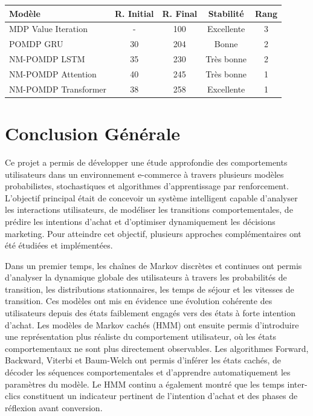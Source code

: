 \documentclass[11pt,a4paper]{article}
\begin{document}
\begin{center}
\begin{tabularx}{0.95\linewidth}{|l|c|c|c|c|}
\hline
\textbf{Modèle} & \textbf{R. Initial} & \textbf{R. Final} & \textbf{Stabilité} & \textbf{Rang} \\
\hline
MDP Value Iteration & - & 100 & Excellente & 3 \\
POMDP GRU & 30 & 204 & Bonne & 2 \\
NM-POMDP LSTM & 35 & 230 & Très bonne & 2 \\
NM-POMDP Attention & 40 & 245 & Très bonne & 1 \\
NM-POMDP Transformer & 38 & 258 & Excellente & 1 \\
\hline
\end{tabularx}
\end{center}
\newpage
\section{Conclusion Générale}




Ce projet a permis de développer une étude approfondie des comportements utilisateurs dans un environnement e-commerce à travers plusieurs modèles probabilistes, stochastiques et algorithmes d’apprentissage par renforcement. L’objectif principal était de concevoir un système intelligent capable d’analyser les interactions utilisateurs, de modéliser les transitions comportementales, de prédire les intentions d’achat et d’optimiser dynamiquement les décisions marketing. Pour atteindre cet objectif, plusieurs approches complémentaires ont été étudiées et implémentées.

Dans un premier temps, les chaînes de Markov discrètes et continues ont permis d’analyser la dynamique globale des utilisateurs à travers les probabilités de transition, les distributions stationnaires, les temps de séjour et les vitesses de transition. Ces modèles ont mis en évidence une évolution cohérente des utilisateurs depuis des états faiblement engagés vers des états à forte intention d’achat. Les modèles de Markov cachés (HMM) ont ensuite permis d’introduire une représentation plus réaliste du comportement utilisateur, où les états comportementaux ne sont plus directement observables. Les algorithmes Forward, Backward, Viterbi et Baum-Welch ont permis d’inférer les états cachés, de décoder les séquences comportementales et d’apprendre automatiquement les paramètres du modèle. Le HMM continu a également montré que les temps inter-clics constituent un indicateur pertinent de l’intention d’achat et des phases de réflexion avant conversion.
\end{document}
